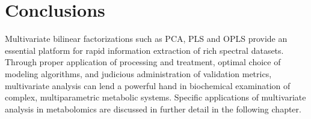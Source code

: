 \section{Conclusions}

\begin{doublespace}
Multivariate bilinear factorizations such as PCA, PLS and OPLS provide an
essential platform for rapid information extraction of rich spectral datasets.
Through proper application of processing and treatment, optimal choice of
modeling algorithms, and judicious administration of validation metrics,
multivariate analysis can lend a powerful hand in biochemical examination of
complex, multiparametric metabolic systems. Specific applications of
multivariate analysis in metabolomics are discussed in further detail in the
following chapter.
\end{doublespace}




